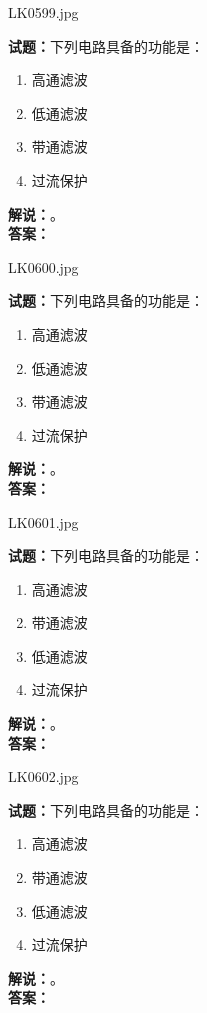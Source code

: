 \documentclass{ctexbook}
\begin{document}
\bigskip

LK0599.jpg

\noindent\textbf{试题：}下列电路具备的功能是：
\begin{enumerate}[leftmargin=3em]
  \item 高通滤波
  \item 低通滤波
  \item 带通滤波
  \item 过流保护
\end{enumerate}
\noindent\textbf{解说：}\textbf{}。\\\noindent\textbf{答案：}

\bigskip

LK0600.jpg

\noindent\textbf{试题：}下列电路具备的功能是：
\begin{enumerate}[leftmargin=3em]
  \item 高通滤波
  \item 低通滤波
  \item 带通滤波
  \item 过流保护
\end{enumerate}
\noindent\textbf{解说：}\textbf{}。\\\noindent\textbf{答案：}

\bigskip

LK0601.jpg

\noindent\textbf{试题：}下列电路具备的功能是：
\begin{enumerate}[leftmargin=3em]
  \item 高通滤波
  \item 带通滤波
  \item 低通滤波
  \item 过流保护
\end{enumerate}
\noindent\textbf{解说：}\textbf{}。\\\noindent\textbf{答案：}

\bigskip

LK0602.jpg

\noindent\textbf{试题：}下列电路具备的功能是：
\begin{enumerate}[leftmargin=3em]
  \item 高通滤波
  \item 带通滤波
  \item 低通滤波
  \item 过流保护
\end{enumerate}
\noindent\textbf{解说：}\textbf{}。\\\noindent\textbf{答案：}
\end{document}
